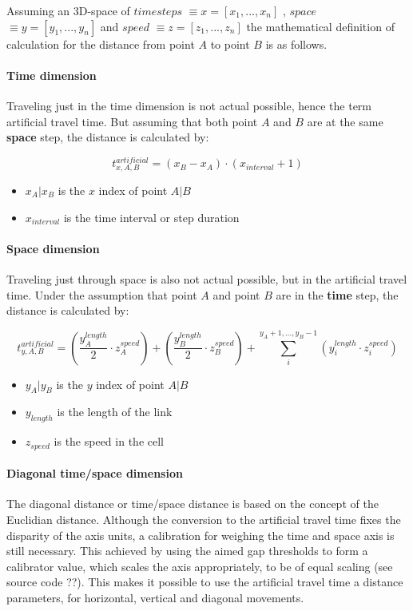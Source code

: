 Assuming an 3D-space of $time steps$ $\equiv x=[x_1,...,x_n]$ , $space$ $\equiv y=[y_1,...,y_n]$ and $speed$ $\equiv z=[z_1,...,z_n]$ the mathematical definition of calculation for the distance from point $A$ to point $B$ is as follows.

\paragraph{Time dimension} Traveling just in the time dimension is not actual possible, hence the term artificial travel time. But assuming that both point $A$ and $B$ are at the same \textbf{space} step, the distance is calculated by:

\begin{equation}
	t_{x,A,B}^{artificial} = (x_B - x_A) \cdot ( x_{interval} + 1 )
	\label{equation_t_v_time}
\end{equation}

\begin{itemize}
	\setlength\itemsep{0.1em}	
	\item[] $x_A | x_B$ is the $x$ index of point $A | B$
	\item[] $x_{interval}$ is the time interval or step duration
\end{itemize}

\paragraph{Space dimension} Traveling just through space is also not actual possible, but in the artificial travel time. Under the assumption that point $A$ and point $B$ are in the \textbf{time} step, the distance is calculated by:  

\begin{equation}
	t_{y,A,B}^{artificial} = (\frac{y_{A}^{length}}{2}  \cdot z_{A}^{speed}) + (\frac{y_{B}^{length}}{2} \cdot z_{B}^{speed}) + \sum_{i}^{y_A + 1,...,y_B - 1} (y_{i}^{length} \cdot z_{i}^{speed})
\end{equation}

\begin{itemize}
	\setlength\itemsep{0.1em}	
	\item[] $y_A | y_B$ is the $y$ index of point $A | B$
	\item[] $y_{length}$ is the length of the link
	\item[] $z_{speed}$ is the speed in the cell
\end{itemize}

\paragraph{Diagonal time/space dimension} The diagonal distance or time/space distance is based on the concept of the Euclidian distance. Although the conversion to the artificial travel time fixes the disparity of the axis units, a calibration for weighing the time and space axis is still necessary. This achieved by using the aimed gap thresholds to form a calibrator value, which scales the axis appropriately, to be of equal scaling (see source code ??). This makes it possible to use the artificial travel time a distance parameters, for horizontal, vertical and diagonal movements.

